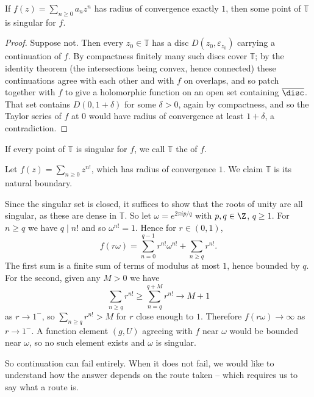 \begin{proposition}
	If $f(z) = \sum_{n \geq 0}a_n z^n$ has radius of convergence exactly $1$, then some
	point of $\mathbb{T}$ is singular for $f$.
\end{proposition}

\begin{proof}
	Suppose not. Then every $z_0 \in \mathbb{T}$ has a disc $D(z_0, \varepsilon_{z_0})$
	carrying a continuation of $f$. By compactness finitely many such discs cover
	$\mathbb{T}$; by the identity theorem (the intersections being convex, hence connected)
	these continuations agree with each other and with $f$ on overlaps, and so patch
	together with $f$ to give a holomorphic function on an open set containing
	$\overline{\disc}$. That set contains $D(0, 1 + \delta)$ for some $\delta > 0$, again
	by compactness, and so the Taylor series of $f$ at $0$ would have radius of convergence
	at least $1 + \delta$, a contradiction.
\end{proof}

\begin{definition}
	If every point of $\mathbb{T}$ is singular for $f$, we call $\mathbb{T}$ the
	 of $f$.
\end{definition}

\begin{example}
	Let $f(z) = \sum_{n \geq 0} z^{n!}$, which has radius of convergence $1$. We claim
	$\mathbb{T}$ is its natural boundary.

	Since the singular set is closed, it suffices to show that the roots of unity are all
	singular, as these are dense in $\mathbb{T}$. So let $\omega = e^{2\pi i p /q}$ with
	$p, q \in \Z$, $q \geq 1$. For $n \geq q$ we have $q \mid n!$ and so
	$\omega^{n!} = 1$. Hence for $r \in (0,1)$,
	$$
	f(r\omega) = \sum_{n = 0}^{q-1} r^{n!}\omega^{n!} + \sum_{n \geq q} r^{n!}.
	$$
	The first sum is a finite sum of terms of modulus at most $1$, hence bounded by $q$.
	For the second, given any $M > 0$ we have
	$$
	\sum_{n \geq q} r^{n!} \geq \sum_{n = q}^{q + M} r^{n!} \longrightarrow M + 1
	$$
	as $r \to 1^-$, so $\sum_{n\geq q} r^{n!} > M$ for $r$ close enough to $1$. Therefore
	$f(r\omega) \to \infty$ as $r \to 1^-$. A function element $(g,U)$ agreeing with $f$
	near $\omega$ would be bounded near $\omega$, so no such element exists and $\omega$
	is singular.
\end{example}

So continuation can fail entirely. When it does not fail, we would like to understand how
the answer depends on the route taken -- which requires us to say what a route is.

